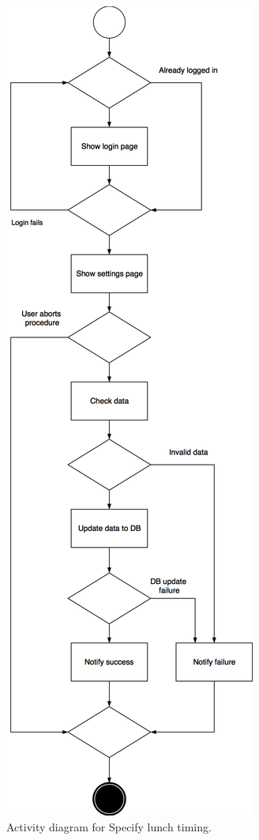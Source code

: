\documentclass{article}
\begin{document}
	\begin{figure}[h!]
		\bigskip
		\centering
		\includegraphics[scale=0.23]{img/diagrams/specify_lunch_timing_ad.png}
		\caption{Activity diagram for Specify lunch timing.}
	\end{figure}
\end{document}
